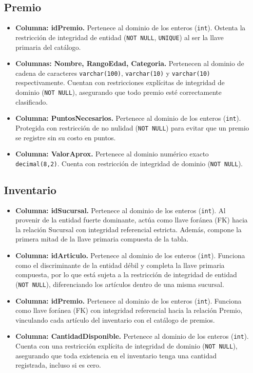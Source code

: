 \documentclass[11pt,letterpaper,spanish]{article}
\begin{document}
\subsection*{Premio}
\begin{itemize}
	\item \textbf{Columna: idPremio.} Pertenece al dominio de los enteros (\texttt{int}). Ostenta la restricción de integridad de entidad (\texttt{NOT NULL}, \texttt{UNIQUE}) al ser la llave primaria del catálogo.
	\item \textbf{Columnas: Nombre, RangoEdad, Categoria.} Pertenecen al dominio de cadena de caracteres \texttt{varchar(100)}, \texttt{varchar(10)} y \texttt{varchar(10)} respectivamente. Cuentan con restricciones explícitas de integridad de dominio (\texttt{NOT NULL}), asegurando que todo premio esté correctamente clasificado.
	\item \textbf{Columna: PuntosNecesarios.} Pertenece al dominio de los enteros (\texttt{int}). Protegida con restricción de no nulidad (\texttt{NOT NULL}) para evitar que un premio se registre sin su costo en puntos.
	\item \textbf{Columna: ValorAprox.} Pertenece al dominio numérico exacto \texttt{decimal(8,2)}. Cuenta con restricción de integridad de dominio (\texttt{NOT NULL}).
\end{itemize}


\subsection*{Inventario}
\begin{itemize}
	\item \textbf{Columna: idSucursal.} Pertenece al dominio de los enteros (\texttt{int}). Al provenir de la entidad fuerte dominante, actúa como llave foránea (FK) hacia la relación Sucursal con integridad referencial estricta. Además, compone la primera mitad de la llave primaria compuesta de la tabla.
	\item \textbf{Columna: idArticulo.} Pertenece al dominio de los enteros (\texttt{int}). Funciona como el discriminante de la entidad débil y completa la llave primaria compuesta, por lo que está sujeta a la restricción de integridad de entidad (\texttt{NOT NULL}), diferenciando los artículos dentro de una misma sucursal.
	\item \textbf{Columna: idPremio.} Pertenece al dominio de los enteros (\texttt{int}). Funciona como llave foránea (FK) con integridad referencial hacia la relación Premio, vinculando cada artículo del inventario con el catálogo de premios.
	\item \textbf{Columna: CantidadDisponible.} Pertenece al dominio de los enteros (\texttt{int}). Cuenta con una restricción explícita de integridad de dominio (\texttt{NOT NULL}), asegurando que toda existencia en el inventario tenga una cantidad registrada, incluso si es cero.
\end{itemize}
\end{document}
